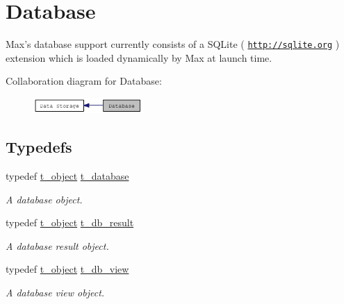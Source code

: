 \hypertarget{group__database}{
\section{Database}
\label{group__database}
}


Max's database support currently consists of a SQLite ( \href{http://sqlite.org}{\tt http://sqlite.org} ) extension which is loaded dynamically by Max at launch time.  


Collaboration diagram for Database:\nopagebreak
\begin{figure}[H]
\begin{center}
\leavevmode
\includegraphics[width=118pt]{group__database}
\end{center}
\end{figure}
\subsection*{Typedefs}
\begin{DoxyCompactItemize}
\item 
typedef \hyperlink{structt__object}{t\_\-object} \hyperlink{group__database_gad832ea0e5fc292661fd20046cee7e3b3}{t\_\-database}
\begin{DoxyCompactList}\small\item\em A database object. \item\end{DoxyCompactList}\item 
typedef \hyperlink{structt__object}{t\_\-object} \hyperlink{group__database_gae34db00cb98960e94b5ca58a7c21c362}{t\_\-db\_\-result}
\begin{DoxyCompactList}\small\item\em A database result object. \item\end{DoxyCompactList}\item 
typedef \hyperlink{structt__object}{t\_\-object} \hyperlink{group__database_gac9ea40a519578e26498dd61ea98b5cf2}{t\_\-db\_\-view}
\begin{DoxyCompactList}\small\item\em A database view object. \item\end{DoxyCompactList}\end{DoxyCompactItemize}
